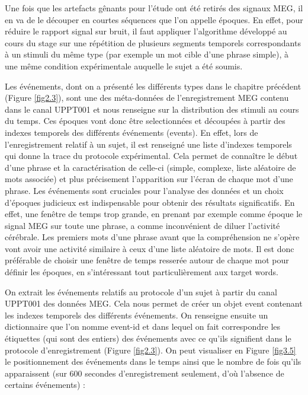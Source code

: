 Une fois que les artefacts gênants pour l'étude ont été retirés des signaux MEG, il en va de le découper en courtes séquences que l'on appelle époques. En effet, pour réduire le rapport signal sur bruit, il faut appliquer l'algorithme développé au cours du stage sur une répétition de plusieurs segments temporels correspondants à un stimuli du même type (par exemple un mot cible d'une phrase simple), à une même condition expérimentale auquelle le sujet a été soumis. 

\vspace{2ex}
Les événements, dont on a présenté les différents types dans le chapitre précédent (Figure \ref{fig2.3}), sont une des méta-données de l'enregistrement MEG contenu dans le canal UPPT001 et nous renseigne sur la distribution des stimuli au cours du temps. Ces époques vont donc être selectionnées et découpées à partir des indexes temporels des différents événements (events). En effet, lors de l'enregistrement relatif à un sujet, il est renseigné une liste d'indexes temporels qui donne la trace du protocole expérimental. Cela permet de connaître le début d'une phrase et la caractérisation de celle-ci (simple, complexe, liste aléatoire de mots associée) et plus précisement l'apparition sur l'écran de chaque mot d'une phrase. 
Les événements sont cruciales pour l'analyse des données et un choix d'époques judicieux est indispensable pour obtenir des résultats significatifs. En effet, une fenêtre de temps trop grande, en prenant par exemple comme époque le signal MEG sur toute une phrase, a comme inconvénient de diluer l'activité cérébrale. Les premiers mots d'une phrase avant que la compréhension ne s'opère vont avoir une activité similaire à ceux d'une liste aléatoire de mots. Il est donc préférable de choisir une fenêtre de temps resserée autour de chaque mot pour définir les époques, en s'intéressant tout particulièrement aux target words.

\vspace{2ex}
On extrait les événements relatifs au protocole d'un sujet à partir du canal UPPT001 des données MEG. Cela nous permet de créer un objet event contenant les indexes temporels des différents événements. On renseigne ensuite un dictionnaire que l'on nomme event-id et dans lequel on fait correspondre les étiquettes (qui sont des entiers) des événements avec ce qu'ils signifient dans le protocole d'enregistrement (Figure \ref{fig2.3}). On peut visualiser en Figure \ref{fig3.5} le positionnement des événements dans le temps ainsi que le nombre de fois qu'ils apparaissent (sur 600 secondes d'enregistrement seulement, d'où l'absence de certains événements) :


